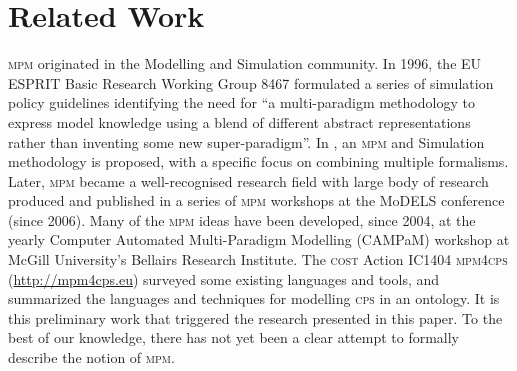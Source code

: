 \section{Related Work}
\label{sec:RelatedWork}


\textsc{mpm} originated in the Modelling and Simulation community. In 1996, the
EU ESPRIT Basic Research Working Group 8467 formulated a series of simulation
policy guidelines \cite{Vangheluwe-VansteenkisteKerckhoffs-1996} identifying the
need for ``a multi-paradigm methodology to express model knowledge using a blend
of different abstract representations rather than inventing some new
super-paradigm''. In \cite{Vangheluwe-Vansteenkiste1996}, an \textsc{mpm} and
Simulation methodology is proposed, with a specific focus on combining multiple
formalisms. Later, \textsc{mpm} became a well-recognised research field with
large body of research produced and published in a series of \textsc{mpm}
workshops at the MoDELS conference (since 2006). Many of the \textsc{mpm} ideas
have been developed, since 2004, at the yearly Computer Automated Multi-Paradigm
Modelling (CAMPaM) workshop at McGill University's Bellairs Research Institute.
The \textsc{cost} Action IC1404 \textsc{mpm4cps} (\url{http://mpm4cps.eu})
surveyed some existing languages and tools, and summarized the languages and
techniques for modelling \textsc{cps} in an ontology.
It is this  preliminary work that triggered the research presented in this
paper.
To the best of our knowledge, there has not yet been a clear attempt to formally
describe the notion of \textsc{mpm}.
